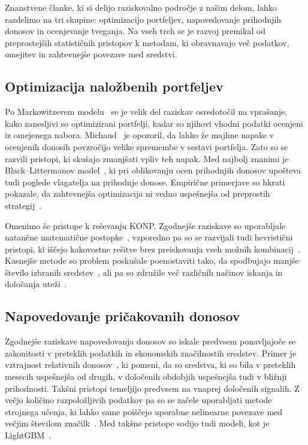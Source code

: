 \documentclass[9pt]{style/friteza}
\begin{document}
Znanstvene članke, ki si delijo raziskovalno področje z našim delom, lahko razdelimo na tri skupine: optimizacijo portfeljev, napovedovanje prihodnjih donosov in ocenjevanje tveganja. Na vseh treh se je razvoj premikal od preprostejših statističnih pristopov k metodam, ki obravnavajo več podatkov, omejitev in zahtevnejše povezave med sredstvi. 

\subsection{Optimizacija naložbenih portfeljev}

Po Markowitzevem modelu~\cite{markowitz1952} se je velik del raziskav osredotočil na vprašanje, kako zanesljivi so optimizirani portfelji, kadar so njihovi vhodni podatki ocenjeni iz omejenega nabora. Michaud~\cite{michaud1989} je opozoril, da lahko že majhne napake v ocenjenih donosih povzročijo velike spremembe v sestavi portfelja. Zato so se razvili pristopi, ki skušajo zmanjšati vpliv teh napak. Med najbolj znanimi je Black--Littermanov model~\cite{black1992,helitterman1999}, ki pri oblikovanju ocen prihodnjih donosov upošteva tudi poglede vlagatelja na prihodnje donose. Empirične primerjave so hkrati pokazale, da zahtevnejša optimizacija ni vedno uspešnejša od preprostih strategij~\cite{demiguel2009,bessler2017,tu2011}.

Omenimo še pristope k reševanju KONP\@. Zgodnejše raziskave so uporabljale natančne matematične postopke~\cite{bienstock1996,gao2013}, vzporedno pa so se razvijali tudi hevristični pristopi, ki iščejo kakovostne rešitve brez preiskovanja vseh možnih kombinacij~\cite{chang2000}. Kasnejše metode so problem poskušale poenostaviti tako, da spodbujajo manjše število izbranih sredstev~\cite{brodie2009,kim2016sparse}, ali pa so združile več različnih načinov iskanja in določanja uteži~\cite{akbay2020}.

\subsection{Napovedovanje pričakovanih donosov}

Zgodnejše raziskave napovedovanja donosov so iskale predvsem ponavljajoče se zakonitosti v preteklih podatkih in ekonomskih značilnostih sredstev. Primer je vztrajnost relativnih donosov~\cite{jegadeesh1993,carhart1997}, ki pomeni, da so sredstva, ki so bila v preteklih mesecih uspešnejša od drugih, v določenih obdobjih uspešnejša tudi v bližnji prihodnosti. Takšni pristopi temeljijo predvsem na vnaprej določenih signalih. Z večjo količino razpoložljivih podatkov pa so se začele uporabljati metode strojnega učenja, ki lahko same poiščejo uporabne nelinearne povezave med večjim številom značilk~\cite{gu2020}. Med takšne pristope sodijo tudi modeli, kot je LightGBM~\cite{ke2017lightgbm}.
\end{document}
